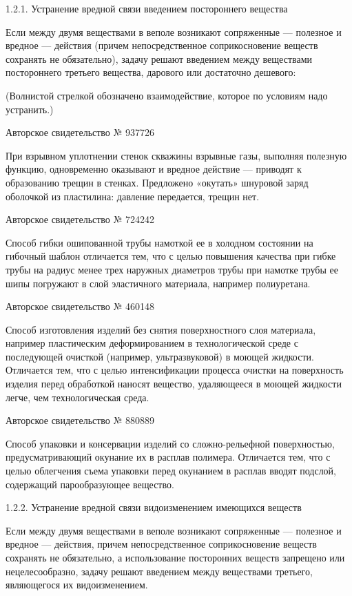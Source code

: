 1.2.1. Устранение вредной связи введением постороннего вещества

Если между двумя веществами в  веполе возникают сопряженные — полезное
и вредное — действия  (причем непосредственное соприкосновение веществ
сохранять не  обязательно), задачу  решают введением  между веществами
постороннего третьего вещества, дарового или достаточно дешевого:

(Волнистой  стрелкой обозначено  взаимодействие,  которое по  условиям
надо устранить.)


Авторское свидетельство № 937726

При  взрывном  уплотнении  стенок  скважины  взрывные  газы,  выполняя
полезную функцию, одновременно оказывают и вредное действие — приводят
к образованию  трещин в  стенках. Предложено «окутать»  шнуровой заряд
оболочкой из пластилина: давление передается, трещин нет.


Авторское свидетельство № 724242

Способ гибки  ошипованной трубы  намоткой ее  в холодном  состоянии на
гибочный шаблон  отличается тем,  что с  целью повышения  качества при
гибке трубы на радиус менее  трех наружных диаметров трубы при намотке
трубы  ее  шипы  погружают  в  слой  эластичного  материала,  например
полиуретана.


Авторское свидетельство № 460148

Способ изготовления изделий без  снятия поверхностного слоя материала,
например  пластическим  деформированием   в  технологической  среде  с
последующей  очисткой (например,  ультразвуковой)  в моющей  жидкости.
Отличается  тем,  что  с  целью  интенсификации  процесса  очистки  на
поверхность изделия  перед обработкой наносят вещество,  удаляющееся в
моющей жидкости легче, чем технологическая среда.


Авторское свидетельство № 880889

Способ   упаковки   и    консервации   изделий   со   сложно-рельефной
поверхностью,  предусматривающий  окунание   их  в  расплав  полимера.
Отличается тем, что с целью  облегчения съема упаковки перед окунанием
в расплав вводят подслой, содержащий парообразующее вещество.


1.2.2. Устранение вредной связи видоизменением имеющихся веществ


Если  между   двумя  веществами  в  веполе   возникают  сопряженные  —
полезное и вредное — действия, причем непосредственное соприкосновение
веществ   сохранять  не   обязательно,  а   использование  посторонних
веществ запрещено  или нецелесообразно, задачу решают  введением между
веществами третьего, являющегося их видоизменением.


